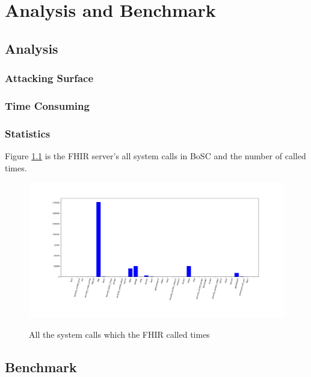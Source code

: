 \chapter{Analysis and Benchmark}

\section{Analysis}
\subsection{Attacking Surface}
\subsection{Time Consuming}
\subsection{Statistics}
Figure \ref{hist} is the FHIR server's all system calls in 
BoSC\cite{1495942} and the number of called times.
\begin{figure}
    \centering
    \includegraphics[width=\textwidth]{src/hist.png}
    \label{hist}
    \caption{All the system calls which the FHIR called times}
\end{figure}



\section{Benchmark}
